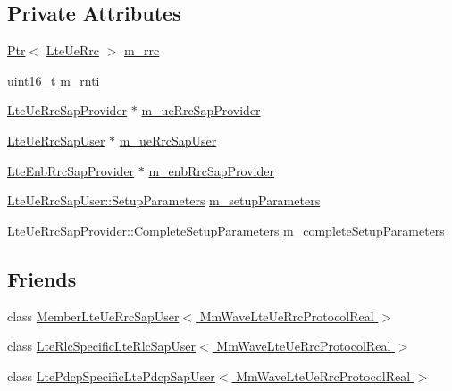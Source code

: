 \subsection*{Private Attributes}
\begin{DoxyCompactItemize}
\item 
\hyperlink{classns3_1_1Ptr}{Ptr}$<$ \hyperlink{classns3_1_1LteUeRrc}{Lte\+Ue\+Rrc} $>$ \hyperlink{classns3_1_1MmWaveLteUeRrcProtocolReal_a367394139f43585b3d9acd65d7a44863}{m\+\_\+rrc}
\item 
uint16\+\_\+t \hyperlink{classns3_1_1MmWaveLteUeRrcProtocolReal_a7bde08ef55c98508633445e64f71f945}{m\+\_\+rnti}
\item 
\hyperlink{classns3_1_1LteUeRrcSapProvider}{Lte\+Ue\+Rrc\+Sap\+Provider} $\ast$ \hyperlink{classns3_1_1MmWaveLteUeRrcProtocolReal_ae4324a866bc59d059e7938a12244eb1f}{m\+\_\+ue\+Rrc\+Sap\+Provider}
\item 
\hyperlink{classns3_1_1LteUeRrcSapUser}{Lte\+Ue\+Rrc\+Sap\+User} $\ast$ \hyperlink{classns3_1_1MmWaveLteUeRrcProtocolReal_a96c160bbef1f7ca98bdf18f29f202658}{m\+\_\+ue\+Rrc\+Sap\+User}
\item 
\hyperlink{classns3_1_1LteEnbRrcSapProvider}{Lte\+Enb\+Rrc\+Sap\+Provider} $\ast$ \hyperlink{classns3_1_1MmWaveLteUeRrcProtocolReal_aef9814d08dddfe492640923f74b525fb}{m\+\_\+enb\+Rrc\+Sap\+Provider}
\item 
\hyperlink{structns3_1_1LteUeRrcSapUser_1_1SetupParameters}{Lte\+Ue\+Rrc\+Sap\+User\+::\+Setup\+Parameters} \hyperlink{classns3_1_1MmWaveLteUeRrcProtocolReal_a3e37b5c092541f31a092de40cea689e3}{m\+\_\+setup\+Parameters}
\item 
\hyperlink{structns3_1_1LteUeRrcSapProvider_1_1CompleteSetupParameters}{Lte\+Ue\+Rrc\+Sap\+Provider\+::\+Complete\+Setup\+Parameters} \hyperlink{classns3_1_1MmWaveLteUeRrcProtocolReal_a36c2f9489be22b1e678a36a98d3cdb8d}{m\+\_\+complete\+Setup\+Parameters}
\end{DoxyCompactItemize}
\subsection*{Friends}
\begin{DoxyCompactItemize}
\item 
class \hyperlink{classns3_1_1MmWaveLteUeRrcProtocolReal_ac5333e9e966fadedf4342f7c59510b6c}{Member\+Lte\+Ue\+Rrc\+Sap\+User$<$ Mm\+Wave\+Lte\+Ue\+Rrc\+Protocol\+Real $>$}
\item 
class \hyperlink{classns3_1_1MmWaveLteUeRrcProtocolReal_abb5ccdbc382cba02f8056068b3ada675}{Lte\+Rlc\+Specific\+Lte\+Rlc\+Sap\+User$<$ Mm\+Wave\+Lte\+Ue\+Rrc\+Protocol\+Real $>$}
\item 
class \hyperlink{classns3_1_1MmWaveLteUeRrcProtocolReal_aed9b1610b5caf394a0652bd87d689ea2}{Lte\+Pdcp\+Specific\+Lte\+Pdcp\+Sap\+User$<$ Mm\+Wave\+Lte\+Ue\+Rrc\+Protocol\+Real $>$}
\end{DoxyCompactItemize}
